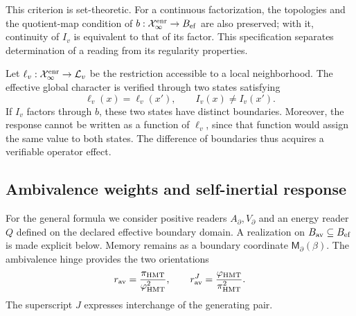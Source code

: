This criterion is set-theoretic. For a continuous factorization, the
topologies and the quotient-map condition
of \(b:\mathcal X_\infty^{\rm enr}\to B_{\rm ef}\) are also preserved; with it,
continuity of \(I_v\) is equivalent to that of its factor. This specification
separates determination of a reading from its regularity properties.

Let \(\ell_v:\mathcal X_\infty^{\rm enr}\to\mathcal L_v\) be the
restriction accessible to a local neighborhood. The effective global character
is verified through two states satisfying
\begin{equation}
 \ell_v(x)=\ell_v(x'),\qquad I_v(x)\neq I_v(x').
 \label{vii:vii:eq:observador-testigo-global}
\end{equation}
If \(I_v\) factors through \(b\), these two states have distinct
boundaries. Moreover, the response cannot be written as a function of
\(\ell_v\), since that function would assign the same value to both states.
The difference of boundaries thus acquires a verifiable operator effect.

\subsection{Ambivalence weights and self-inertial response}
\label{vii:vii:sec:observador-ambivalencia}

For the general formula we consider positive readers
\(A_\partial,V_\partial\) and an energy reader \(Q\)
defined on the declared effective boundary domain.
A realization on
\(B_{\rm av}\subseteq B_{\rm ef}\) is made explicit below. Memory remains as a boundary
coordinate \(\mathsf M_\partial(\beta)\). The ambivalence
hinge provides the two orientations
\[
 r_{\rm av}=\frac{\pi_{\rm HMT}}{\varphi_{\rm HMT}^2},\qquad
 r_{\rm av}^{J}=\frac{\varphi_{\rm HMT}}{\pi_{\rm HMT}^2}.
\]
The superscript \(J\) expresses interchange of the generating pair.
